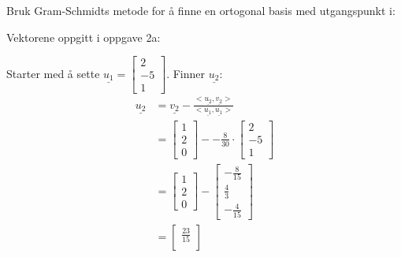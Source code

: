 \documentclass[11pt, a4paper, norsk]{NTNUoving}
\begin{document}
   \begin{oppgave}
       Bruk Gram-Schmidts metode for å finne en ortogonal basis med utgangspunkt i:
       \begin{punkt}
           Vektorene oppgitt i oppgave 2a:

           Starter med å sette $\underline{u_1} = \begin{bmatrix}
               2 \\
               -5 \\
               1
           \end{bmatrix}$. Finner $\underline{u_2}$:
           \begin{align*}
               \underline{u_2} &= \underline{v_2} - \frac{<\underline{u_2}, \underline{v_2}>}{<\underline{u_1}, \underline{u_1}>}
               \\
                               &= \begin{bmatrix}
                                   1 \\
                                   2 \\
                                   0
                               \end{bmatrix} - -\frac{8}{30}\cdot \begin{bmatrix}
                                   2 \\
                                   -5 \\
                                   1
                               \end{bmatrix}
                               \\
                               &= \begin{bmatrix}
                                   1 \\
                                   2 \\
                                   0
                               \end{bmatrix} - \begin{bmatrix}
                                   -\frac{8}{15} \\
                                   \frac{4}{3} \\
                                   -\frac{4}{15}
                               \end{bmatrix}
                               \\
                               &= \begin{bmatrix}
                                   \frac{23}{15} \\

\end{bmatrix}
\end{align*}
\end{punkt}
\end{oppgave}
\end{document}
